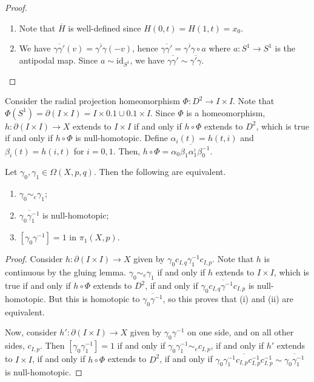 \begin{proof}
	\begin{enumerate}
		\item Note that \( \overline H \) is well-defined since \( H(0,t) = H(1,t) = x_0 \).
		\item We have \( \overline{\gamma\gamma'}(v) = \overline{\gamma'\gamma}(-v) \), hence \( \overline{\gamma\gamma'} = \overline{\gamma'\gamma} \circ a \) where \( a \colon S^1 \to S^1 \) is the antipodal map.
			Since \( a \sim \mathrm{id}_{S^1} \), we have \( \overline{\gamma\gamma'} \sim \overline{\gamma'\gamma} \).
	\end{enumerate}
\end{proof}
Consider the radial projection homeomorphism \( \Phi \colon D^2 \to I \times I \).
Note that \( \Phi(S^1) = \partial (I \times I) = I \times \qty{0,1} \cup \qty{0,1} \times I \).
Since \( \Phi \) is a homeomorphism, \( h \colon \partial (I \times I) \to X \) extends to \( I \times I \) if and only if \( h \circ \Phi \) extends to \( D^2 \), which is true if and only if \( h \circ \Phi \) is null-homotopic.
Define \( \alpha_i(t) = h(t,i) \) and \( \beta_i(t) = h(i,t) \) for \( i = 0,1 \).
Then, \( h \circ \Phi = \overline{\alpha_0\beta_1\alpha_1^{_1}\beta_0^{-1}} \).
\begin{proposition}
	Let \( \gamma_0, \gamma_1 \in \Omega(X,p,q) \).
	Then the following are equivalent.
	\begin{enumerate}
		\item \( \gamma_0 \sim_e \gamma_1 \);
		\item \( \overline{\gamma_0\gamma_1^{-1}} \) is null-homotopic;
		\item \( [\gamma_0\gamma^{-1}] = 1 \) in \( \pi_1(X,p) \).
	\end{enumerate}
\end{proposition}
\begin{proof}
	Consider \( h \colon \partial (I \times I) \to X \) given by \( \gamma_0 c_{I,q} \gamma_1^{-1} c_{I,p} \).
	Note that \( h \) is continuous by the gluing lemma.
	\( \gamma_0 \sim_e \gamma_1 \) if and only if \( h \) extends to \( I \times I \), which is true if and only if \( h \circ \Phi \) extends to \( D^2 \), if and only if \( \overline{\gamma_0 c_{I,q} \gamma^{-1} c_{I,p}} \) is null-homotopic.
	But this is homotopic to \( \overline{\gamma_0\gamma^{-1}} \), so this proves that (i) and (ii) are equivalent.

	Now, consider \( h' \colon \partial (I \times I) \to X \) given by \( \gamma_0 \gamma^{-1} \) on one side, and on all other sides, \( c_{I,p} \).
	Then \( [\gamma_0\gamma_1^{-1}] = 1 \) if and only if \( \gamma_0 \gamma_1^{-1} \sim_e c_{I,p} \), if and only if \( h' \) extends to \( I \times I \), if and only if \( h \circ \Phi \) extends to \( D^2 \), if and only if \( \overline{\gamma_0\gamma_1^{-1} c_{I,p} c_{I,p}^{-1} c_{I,p}^{-1}} \sim \overline{\gamma_0\gamma_1^{-1}} \) is null-homotopic.
\end{proof}
